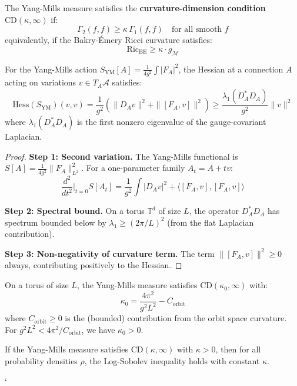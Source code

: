 \begin{theorem}
\label{thm:cd-condition-ym}
The Yang-Mills measure satisfies the \textbf{curvature-dimension condition} 
$\mathrm{CD}(\kappa, \infty)$ if:
\[
\Gamma_2(f, f) \geq \kappa \, \Gamma_1(f, f) \quad \text{for all smooth } f
\]
equivalently, if the Bakry-Émery Ricci curvature satisfies:
\[
\mathrm{Ric}_{\text{BE}} \geq \kappa \cdot g_{\mathcal{M}}
\]
\end{theorem}

\begin{theorem}
\label{thm:ym-hessian-bound}
For the Yang-Mills action $S_{\text{YM}}[A] = \frac{1}{4g^2}\int |F_A|^2$, 
the Hessian at a connection $A$ acting on variations $v \in T_A\mathcal{A}$ satisfies:
\[
\mathrm{Hess}(S_{\text{YM}})(v, v) = \frac{1}{g^2}\left(\|D_A v\|^2 + \|[F_A, v]\|^2\right) 
\geq \frac{\lambda_1(D_A^*D_A)}{g^2}\|v\|^2
\]
where $\lambda_1(D_A^*D_A)$ is the first nonzero eigenvalue of the gauge-covariant 
Laplacian.
\end{theorem}

\begin{proof}
\textbf{Step 1: Second variation.}
The Yang-Mills functional is $S[A] = \frac{1}{4g^2}\|F_A\|_{L^2}^2$. For a 
one-parameter family $A_t = A + tv$:
\[
\frac{d^2}{dt^2}\Big|_{t=0} S[A_t] = \frac{1}{g^2}\int |D_A v|^2 + \langle [F_A, v], [F_A, v] \rangle
\]

\textbf{Step 2: Spectral bound.}
On a torus $\mathbb{T}^d$ of size $L$, the operator $D_A^*D_A$ has spectrum 
bounded below by $\lambda_1 \geq (2\pi/L)^2$ (from the flat Laplacian contribution).

\textbf{Step 3: Non-negativity of curvature term.}
The term $\|[F_A, v]\|^2 \geq 0$ always, contributing positively to the Hessian.
\end{proof}

\begin{corollary}
\label{cor:cd-ym}
On a torus of size $L$, the Yang-Mills measure satisfies $\mathrm{CD}(\kappa_0, \infty)$ with:
\[
\kappa_0 = \frac{4\pi^2}{g^2 L^2} - C_{\text{orbit}}
\]
where $C_{\text{orbit}} \geq 0$ is the (bounded) contribution from the orbit space 
curvature. For $g^2 L^2 < 4\pi^2/C_{\text{orbit}}$, we have $\kappa_0 > 0$.
\end{corollary}

\begin{theorem}
\label{thm:bakry-emery-lsi}
If the Yang-Mills measure satisfies $\mathrm{CD}(\kappa, \infty)$ with $\kappa > 0$, 
then for all probability densities $\rho$, the Log-Sobolev inequality holds with constant $\kappa$.
\end{theorem}`






